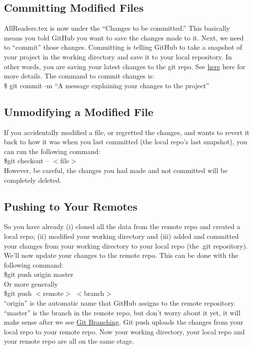 \documentclass{article}
\begin{document}
    \subsection{Committing Modified Files}
    AllReaders.tex is now under the ``Changes to be committed.'' This basically means you told GitHub you want to save the changes made to it. Next, we need to ``commit'' those changes. Committing is telling GitHub to take a snapshot of your project in the working directory and save it to your local repository. In other words, you are saving your latest changes to the git repo.
    See \href{https://git-scm.com/docs/git-commit}{here} here for more details. The command to commit changes is: \\
    \newline
    \indent \$ git commit -m ``A message explaining your changes to the project''
    \subsection{Unmodifying a Modified File}
    If you accidentally modified a file, or regretted the changes, and wants to revert it back to how it was when you last committed (the local repo's last snapshot), you can run the following command: \\
    \newline
    \indent \$git checkout -- $<$file$>$ \\
    \newline
    However, be careful, the changes you had made and not committed will be completely deleted.
    \subsection{Pushing to Your Remotes}
    \label{sec:pushing}
    So you have already (i) cloned all the data from the remote repo and created a local repo; (ii) modified your working directory and (iii) added and committed your changes from your working directory to your local repo (the .git repository). We'll now update your changes to the remote repo. This can be done with the following command: \\
    \newline
    \indent \$git push origin master \\
    \newline
    Or more generally \\
    \newline
    \indent \$git push $<$remote$>$ $<$branch$>$ \\
    \newline
    ``origin'' is the automatic name that GitHub assigns to the remote repository. ``master'' is the branch in the remote repo, but don't worry about it yet, it will make sense after we see \hyperref[sec:branching]{Git Branching}. Git push uploads the changes from your local repo to your remote repo. Now your working directory, your local repo and your remote repo are all on the same stage.
\end{document}
